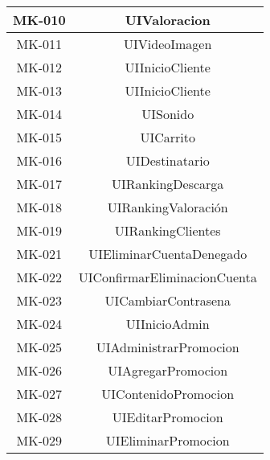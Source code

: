 \begin{longtable}{|c|c|}
MK-010 & UIValoracion  \\
\hline

MK-011 & UIVideoImagen \\
\hline

MK-012 & UIInicioCliente\\
\hline

MK-013 & UIInicioCliente \\
\hline

MK-014 & UISonido  \\
\hline

MK-015 & UICarrito  \\
\hline

MK-016 & UIDestinatario \\
\hline

MK-017 & UIRankingDescarga  \\
\hline

MK-018 & UIRankingValoración \\
\hline

MK-019 & UIRankingClientes  \\
\hline

MK-021 & UIEliminarCuentaDenegado \\ 
\hline

MK-022 & UIConfirmarEliminacionCuenta \\
\hline

MK-023 & UICambiarContrasena  \\
\hline

MK-024 & UIInicioAdmin  \\
\hline

MK-025 & UIAdministrarPromocion  \\
\hline

MK-026 & UIAgregarPromocion  \\
\hline

MK-027 & UIContenidoPromocion  \\
\hline

MK-028 & UIEditarPromocion \\
\hline

MK-029 & UIEliminarPromocion \\
\hline


\end{longtable}
